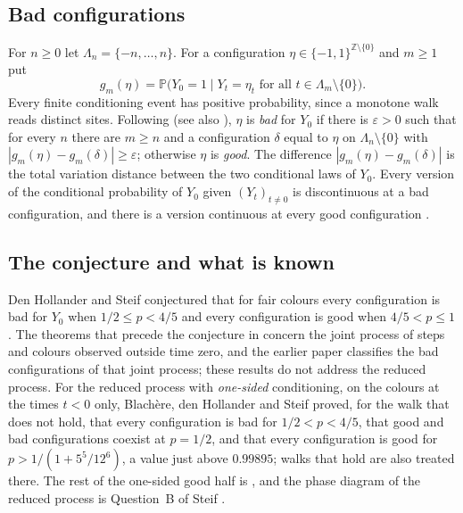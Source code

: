\documentclass[11pt]{amsart}
\theoremstyle{remark}
\newcommand{\Z}{\mathbb{Z}}
\newcommand{\PP}{\mathbb{P}}
\begin{document}
\subsection{Bad configurations}
For $n\ge0$ let $\Lambda_n=\{-n,\dots,n\}$. For a configuration $\eta\in\{-1,1\}^{\Z\setminus\{0\}}$ and $m\ge1$ put
\begin{equation}\label{eq:gm}
g_m(\eta)=\PP\bigl(Y_0=1\mid Y_t=\eta_t\text{ for all }t\in\Lambda_m\setminus\{0\}\bigr).
\end{equation}
Every finite conditioning event has positive probability, since a monotone walk reads distinct sites. Following
\cite[Section~2.6]{dHS06} (see also \cite{MRM99,vEFS93}), $\eta$ is \emph{bad} for $Y_0$ if there is $\varepsilon>0$ such
that for every $n$ there are $m\ge n$ and a configuration $\delta$ equal to $\eta$ on $\Lambda_n\setminus\{0\}$ with
$|g_m(\eta)-g_m(\delta)|\ge\varepsilon$; otherwise $\eta$ is \emph{good}. The difference $|g_m(\eta)-g_m(\delta)|$ is the
total variation distance between the two conditional laws of $Y_0$. Every version of the conditional probability of
$Y_0$ given $(Y_t)_{t\ne0}$ is discontinuous at a bad configuration, and there is a version continuous at every good
configuration \cite{dHSvdW05,MRM99}.

\subsection{The conjecture and what is known}
Den Hollander and Steif \cite[Conjecture~2.16]{dHS06} conjectured that for fair colours every configuration is bad for
$Y_0$ when $1/2\le p<4/5$ and every configuration is good when $4/5<p\le1$. The theorems that precede the conjecture in
\cite[Section~2.6]{dHS06} concern the joint process of steps and colours observed outside time zero, and the earlier
paper \cite{dHSvdW05} classifies the bad configurations of that joint process; these results do not address the reduced
process. For the reduced process with \emph{one-sided} conditioning, on the colours at the times $t<0$ only, Blach\`ere,
den Hollander and Steif \cite[Theorem~1.3]{BdHS11} proved, for the walk that does not hold, that every configuration is bad for $1/2<p<4/5$, that good and bad
configurations coexist at $p=1/2$, and that every configuration is good for $p>1/(1+5^5/12^6)$, a value just above $0.99895$; walks
that hold are also treated there. The rest of the one-sided good half is \cite[Conjecture~1.4]{BdHS11}, and the phase
diagram of the reduced process is Question~B of Steif \cite{Ste21}.
\end{document}
